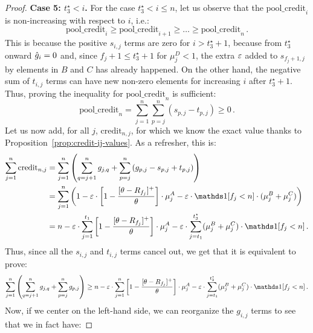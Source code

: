 \begin{proof}
    
    \smallskip
    \noindent\textbf{Case 5: $t_3^\star<i$.} For the case $t_3^\star <i\leq n$, let us observe that the $\text{pool\_credit}_i$ is non-increasing with respect to $i$, i.e.:
    \begin{equation*}
        \text{pool\_credit}_i \geq \text{pool\_credit}_{i+1} \geq \dots \geq \text{pool\_credit}_{n}\,.
    \end{equation*}
    This is because the positive $s_{i,j}$ terms are zero for $i>t_3^\star+1$, because from $t_3^\star$ onward $\hat{g}_{i} = 0$ and, since $f_j+1 \leq t_3^\star+1$ for $\mu_j^D<1$, the extra $\varepsilon$ added to $s_{f_j+1,j}$ by elements in $B$ and $C$ has already happened. On the other hand, the negative sum of $t_{i,j}$ terms can have new non-zero elements for increasing $i$ after $t_3^\star+1$. Thus, proving the inequality for $\text{pool\_credit}_{n}$ is sufficient:
    \begin{equation*}
        \text{pool\_credit}_{n} = \sum_{j=1}^n \sum_{p=j}^n \left(s_{p,j} - t_{p,j}\right) \geq 0\,.
    \end{equation*}
    Let us now add, for all $j$, $\text{credit}_{n,j}$, for which we know the exact value thanks to Proposition~\ref{prop:credit-ij-values}. As a refresher, this is:
    \begin{align*}
        \sum_{j=1}^{n} \text{credit}_{n,j} &= \sum_{j=1}^{n}\Paren{ \sum_{q=j+1}^{n} g_{j,q} + \sum_{p=j}^{n} \left(g_{p,j} - s_{p,j} + t_{p,j}\right)} \\
    &= \sum_{j=1}^{n} \Paren{1 - \Mcoeffmone\cdot \left[1-\frac{[\MRttwo-R_{f_j}]^+}{\MRttwo}\right] \cdot \mu_j^A - \Mcoeffmone\cdot \ind[f_j < n] \cdot ( \mu_j^B +  \mu_j^C)}\\
    &= n - \Mcoeffmone\cdot \sum_{j=1}^{t_1} \left[1-\frac{[\MRttwo-R_{f_j}]^+}{\MRttwo}\right] \cdot \mu_j^A - \Mcoeffmone \cdot \sum_{j=t_1}^{t_3^\star}(\mu_j^B+\mu_j^C)\cdot \ind[f_j<n]\,.
    \end{align*}
    Thus, since all the $s_{i,j}$ and $t_{i,j}$ terms cancel out, we get that it is equivalent to prove:
    \begin{equation*}
        \sum_{j=1}^n \left(\sum_{q=j+1}^{n} g_{j,q} + \sum_{p=j}^{n} g_{p,j} \right)\geq n - \Mcoeffmone\cdot \sum_{j=1}^{n}\left[1-\frac{[\MRttwo-R_{f_j}]^+}{\MRttwo}\right] \cdot \mu_j^A- \Mcoeffmone \cdot \sum_{j=t_1}^{t_3^\star}(\mu_j^B+\mu_j^C)\cdot \ind[f_j<n]\,.
    \end{equation*}
    Now, if we center on the left-hand side, we can reorganize the $g_{i,j}$ terms to see that we in fact have:

\end{proof}

